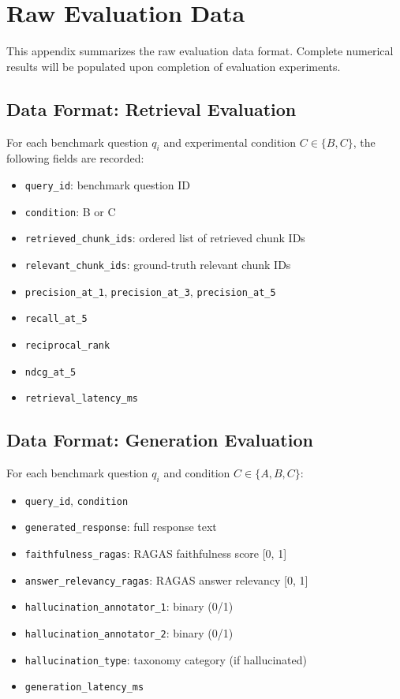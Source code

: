 \chapter{Raw Evaluation Data}
\label{app:raw-data}

This appendix summarizes the raw evaluation data format. Complete numerical results will be populated upon completion of evaluation experiments.

\section*{Data Format: Retrieval Evaluation}

For each benchmark question $q_i$ and experimental condition $C \in \{B, C\}$, the following fields are recorded:

\begin{itemize}
  \item \texttt{query\_id}: benchmark question ID
  \item \texttt{condition}: B or C
  \item \texttt{retrieved\_chunk\_ids}: ordered list of retrieved chunk IDs
  \item \texttt{relevant\_chunk\_ids}: ground-truth relevant chunk IDs
  \item \texttt{precision\_at\_1}, \texttt{precision\_at\_3}, \texttt{precision\_at\_5}
  \item \texttt{recall\_at\_5}
  \item \texttt{reciprocal\_rank}
  \item \texttt{ndcg\_at\_5}
  \item \texttt{retrieval\_latency\_ms}
\end{itemize}

\section*{Data Format: Generation Evaluation}

For each benchmark question $q_i$ and condition $C \in \{A, B, C\}$:

\begin{itemize}
  \item \texttt{query\_id}, \texttt{condition}
  \item \texttt{generated\_response}: full response text
  \item \texttt{faithfulness\_ragas}: RAGAS faithfulness score [0, 1]
  \item \texttt{answer\_relevancy\_ragas}: RAGAS answer relevancy [0, 1]
  \item \texttt{hallucination\_annotator\_1}: binary (0/1)
  \item \texttt{hallucination\_annotator\_2}: binary (0/1)
  \item \texttt{hallucination\_type}: taxonomy category (if hallucinated)
  \item \texttt{generation\_latency\_ms}
\end{itemize}
